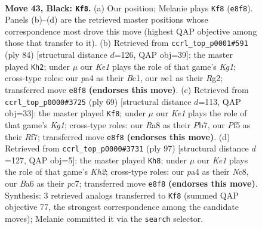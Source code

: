 \documentclass[11pt]{article}
\begin{document}
\clearpage

\begin{figure}[p]\centering
\begin{subfigure}{0.46\textwidth}\centering
\resizebox{\linewidth}{!}{%
\newchessgame
\chessboard[
  setfen={r3k3/7p/bq2p3/p2pbpB1/P1np3P/5Q2/5P2/RNR1N1K1 b - - 7 43},
  showmover=false,
  pgfstyle=straightmove, color=movearrow, markmove={e8-f8}
]}
\caption{}
\end{subfigure}\hfill
\begin{subfigure}{0.46\textwidth}\centering
\resizebox{\linewidth}{!}{%
\newchessgame
\chessboard[
  setfen={1r3nk1/4brp1/4p2p/3pP2P/3P1PQ1/1P1q4/4N1R1/R1B3K1 w - - 13 43},
  showmover=false,
  pgfstyle=straightmove, color=movearrow, markmove={g1-h2}
]}
\caption{}
\end{subfigure}
\\[4pt]
\begin{subfigure}{0.46\textwidth}\centering
\resizebox{\linewidth}{!}{%
\newchessgame
\chessboard[
  setfen={6k1/pp1q1rp1/4np2/2b1p2Q/4N2R/2PP4/P2B1P1P/7K b - - 11 35},
  showmover=false,
  pgfstyle=straightmove, color=movearrow, markmove={g8-f8}
]}
\caption{}
\end{subfigure}\hfill
\begin{subfigure}{0.46\textwidth}\centering
\resizebox{\linewidth}{!}{%
\newchessgame
\chessboard[
  setfen={2n2r2/p1P2pbk/P1Qp2p1/7p/2p1NP1P/3q4/3BR1P1/5K2 b - - 14 49},
  showmover=false,
  pgfstyle=straightmove, color=movearrow, markmove={h7-h8}
]}
\caption{}
\end{subfigure}
\caption{\textbf{Move 43, Black: \texttt{Kf8}.} (a) Our position; Melanie plays \texttt{Kf8} (\texttt{e8f8}). Panels (b)--(d) are the retrieved master positions whose correspondence most drove this move (highest QAP objective among those that transfer to it). (b) Retrieved from \texttt{ccrl\_top\_p0001\#591} (ply 84) [structural distance $d$=126, QAP obj=39]: the master played \texttt{Kh2}; under $\mu$ our \emph{Ke1} plays the role of that game's \emph{Kg1}; cross-type roles: our \emph{p}a4 as their \emph{B}c1, our \emph{n}e1 as their \emph{R}g2; transferred move \texttt{e8f8} \textbf{(endorses this move)}. (c) Retrieved from \texttt{ccrl\_top\_p0000\#3725} (ply 69) [structural distance $d$=113, QAP obj=33]: the master played \texttt{Kf8}; under $\mu$ our \emph{Ke1} plays the role of that game's \emph{Kg1}; cross-type roles: our \emph{R}a8 as their \emph{P}b7, our \emph{P}f5 as their \emph{R}f7; transferred move \texttt{e8f8} \textbf{(endorses this move)}. (d) Retrieved from \texttt{ccrl\_top\_p0000\#3731} (ply 97) [structural distance $d$=127, QAP obj=5]: the master played \texttt{Kh8}; under $\mu$ our \emph{Ke1} plays the role of that game's \emph{Kh2}; cross-type roles: our \emph{p}a4 as their \emph{N}c8, our \emph{B}a6 as their \emph{p}c7; transferred move \texttt{e8f8} \textbf{(endorses this move)}. Synthesis: 3 retrieved analogs transferred to \texttt{Kf8} (summed QAP objective 77, the strongest correspondence among the candidate moves); Melanie committed it via the \texttt{search} selector.}
\label{fig:thought-m85}
\end{figure}
\end{document}
